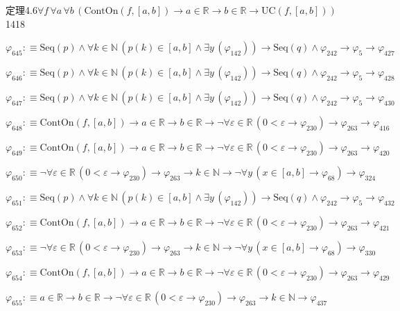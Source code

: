 \begin{fullproof}{定理4.6}{$\forall f\,\forall a\,\forall b\,(\mathrm{ContOn}(f,[a,b]) \to a \in \mathbb{R} \to b \in \mathbb{R} \to \mathrm{UC}(f,[a,b]))$}{1418}
\begin{abbrevlist}
\item $\varphi_{645} :\equiv \mathrm{Seq}(p) \land \forall k \in \mathbb{N}\,(p(k) \in [a,b] \land \exists y\,(\varphi_{142})) \to \mathrm{Seq}(q) \land \varphi_{242} \to \varphi_{5} \to \varphi_{427}$
\item $\varphi_{646} :\equiv \mathrm{Seq}(p) \land \forall k \in \mathbb{N}\,(p(k) \in [a,b] \land \exists y\,(\varphi_{142})) \to \mathrm{Seq}(q) \land \varphi_{242} \to \varphi_{5} \to \varphi_{428}$
\item $\varphi_{647} :\equiv \mathrm{Seq}(p) \land \forall k \in \mathbb{N}\,(p(k) \in [a,b] \land \exists y\,(\varphi_{142})) \to \mathrm{Seq}(q) \land \varphi_{242} \to \varphi_{5} \to \varphi_{430}$
\item $\varphi_{648} :\equiv \mathrm{ContOn}(f,[a,b]) \to a \in \mathbb{R} \to b \in \mathbb{R} \to \neg \forall \varepsilon \in \mathbb{R}\,(0 < \varepsilon \to \varphi_{230}) \to \varphi_{263} \to \varphi_{416}$
\item $\varphi_{649} :\equiv \mathrm{ContOn}(f,[a,b]) \to a \in \mathbb{R} \to b \in \mathbb{R} \to \neg \forall \varepsilon \in \mathbb{R}\,(0 < \varepsilon \to \varphi_{230}) \to \varphi_{263} \to \varphi_{420}$
\item $\varphi_{650} :\equiv \neg \forall \varepsilon \in \mathbb{R}\,(0 < \varepsilon \to \varphi_{230}) \to \varphi_{263} \to k \in \mathbb{N} \to \neg \forall y\,(x \in [a,b] \to \varphi_{68}) \to \varphi_{324}$
\item $\varphi_{651} :\equiv \mathrm{Seq}(p) \land \forall k \in \mathbb{N}\,(p(k) \in [a,b] \land \exists y\,(\varphi_{142})) \to \mathrm{Seq}(q) \land \varphi_{242} \to \varphi_{5} \to \varphi_{432}$
\item $\varphi_{652} :\equiv \mathrm{ContOn}(f,[a,b]) \to a \in \mathbb{R} \to b \in \mathbb{R} \to \neg \forall \varepsilon \in \mathbb{R}\,(0 < \varepsilon \to \varphi_{230}) \to \varphi_{263} \to \varphi_{421}$
\item $\varphi_{653} :\equiv \neg \forall \varepsilon \in \mathbb{R}\,(0 < \varepsilon \to \varphi_{230}) \to \varphi_{263} \to k \in \mathbb{N} \to \neg \forall y\,(x \in [a,b] \to \varphi_{68}) \to \varphi_{330}$
\item $\varphi_{654} :\equiv \mathrm{ContOn}(f,[a,b]) \to a \in \mathbb{R} \to b \in \mathbb{R} \to \neg \forall \varepsilon \in \mathbb{R}\,(0 < \varepsilon \to \varphi_{230}) \to \varphi_{263} \to \varphi_{429}$
\item $\varphi_{655} :\equiv a \in \mathbb{R} \to b \in \mathbb{R} \to \neg \forall \varepsilon \in \mathbb{R}\,(0 < \varepsilon \to \varphi_{230}) \to \varphi_{263} \to k \in \mathbb{N} \to \varphi_{437}$

\end{abbrevlist}
\end{fullproof}
